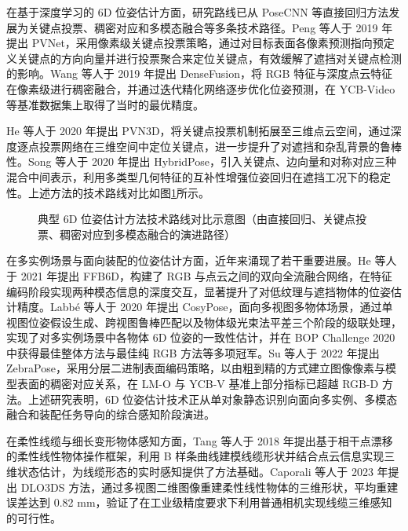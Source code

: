 在基于深度学习的 6D 位姿估计方面，研究路线已从 PoseCNN\cite{Xiang2018posecnn} 等直接回归方法发展为关键点投票、稠密对应和多模态融合等多条技术路径。Peng 等人于 2019 年提出 PVNet\cite{Peng2019pvnet}，采用像素级关键点投票策略，通过对目标表面各像素预测指向预定义关键点的方向向量并进行投票聚合来定位关键点，有效缓解了遮挡对关键点检测的影响。Wang 等人于 2019 年提出 DenseFusion\cite{Wang2019densefusion}，将 RGB 特征与深度点云特征在像素级进行稠密融合，并通过迭代精化网络逐步优化位姿预测，在 YCB-Video 等基准数据集上取得了当时的最优精度。

He 等人于 2020 年提出 PVN3D\cite{He2020pvn3d}，将关键点投票机制拓展至三维点云空间，通过深度逐点投票网络在三维空间中定位关键点，进一步提升了对遮挡和杂乱背景的鲁棒性。Song 等人于 2020 年提出 HybridPose\cite{Song2020hybridpose}，引入关键点、边向量和对称对应三种混合中间表示，利用多类型几何特征的互补性增强位姿回归在遮挡工况下的稳定性。上述方法的技术路线对比如图\ref{fig:ch1:pose-methods}所示。

\begin{figure}[htbp]
  \centering
  \caption{典型 6D 位姿估计方法技术路线对比示意图（由直接回归、关键点投票、稠密对应到多模态融合的演进路径）}
  \label{fig:ch1:pose-methods}
\end{figure}

在多实例场景与面向装配的位姿估计方面，近年来涌现了若干重要进展。He 等人于 2021 年提出 FFB6D\cite{He2021ffb6d}，构建了 RGB 与点云之间的双向全流融合网络，在特征编码阶段实现两种模态信息的深度交互，显著提升了对低纹理与遮挡物体的位姿估计精度。Labb\'{e} 等人于 2020 年提出 CosyPose\cite{Labbe2020cosypose}，面向多视图多物体场景，通过单视图位姿假设生成、跨视图鲁棒匹配以及物体级光束法平差三个阶段的级联处理，实现了对多实例场景中各物体 6D 位姿的一致性估计，并在 BOP Challenge 2020 中获得最佳整体方法与最佳纯 RGB 方法等多项冠军。Su 等人于 2022 年提出 ZebraPose\cite{Su2022zebrapose}，采用分层二进制表面编码策略，以由粗到精的方式建立图像像素与模型表面的稠密对应关系，在 LM-O 与 YCB-V 基准上部分指标已超越 RGB-D 方法。上述研究表明，6D 位姿估计技术正从单对象静态识别向面向多实例、多模态融合和装配任务导向的综合感知阶段演进。

在柔性线缆与细长变形物体感知方面，Tang 等人于 2018 年提出基于相干点漂移的柔性线性物体操作框架\cite{Tang2018}，利用 B 样条曲线建模线缆形状并结合点云信息实现三维状态估计，为线缆形态的实时感知提供了方法基础。Caporali 等人于 2023 年提出 DLO3DS 方法\cite{Caporali2023}，通过多视图二维图像重建柔性线性物体的三维形状，平均重建误差达到 0.82 mm，验证了在工业级精度要求下利用普通相机实现线缆三维感知的可行性。


